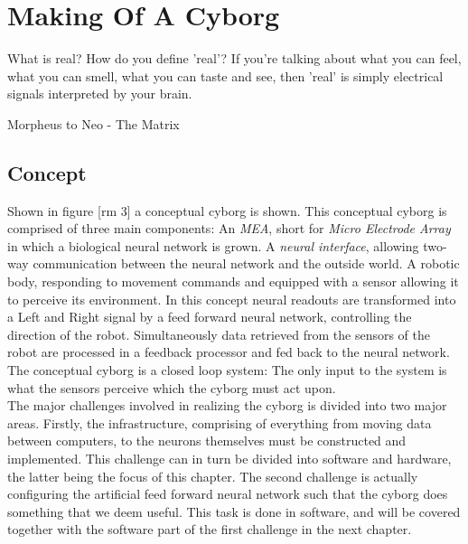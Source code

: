 \chapter{Making Of A Cyborg}
\epigraph{What is real? How do you define 'real'? If you're talking about what
you can feel, what you can smell, what you can taste and see, then 'real' is
simply electrical signals interpreted by your brain.}
{Morpheus to Neo - The Matrix}
\section{Concept}
Shown in figure [rm 3] a conceptual cyborg is shown.
This conceptual cyborg is comprised of three main components: An \emph{MEA}, short
for \emph{Micro Electrode Array} in which a biological neural network is grown.
A \emph{neural interface}, allowing two-way communication between the neural network and
the outside world.
A robotic body, responding to movement commands and equipped with a sensor
allowing it to perceive its environment.
In this concept neural readouts are transformed into a Left and Right signal by
a feed forward neural network, controlling the direction of the robot.
Simultaneously data retrieved from the sensors of the robot are processed in a
feedback processor and fed back to the neural network.
The conceptual cyborg is a closed loop system: The only input to the system is
what the sensors perceive which the cyborg must act upon.\\
The major challenges involved in realizing the cyborg is divided into two major
areas.
Firstly, the infrastructure, comprising of everything from moving data between
computers, to the neurons themselves must be constructed and implemented.
This challenge can in turn be divided into software and hardware, the latter
being the focus of this chapter.
The second challenge is actually configuring the artificial feed forward neural
network such that the cyborg does something that we deem useful.
This task is done in software, and will be covered together with the software
part of the first challenge in the next chapter.
